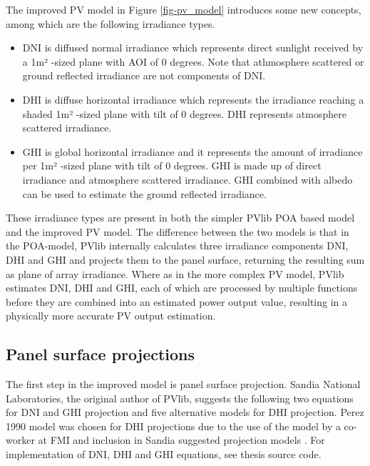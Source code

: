 \noindent 
The improved PV model in Figure \ref{fig-pv_model} introduces some new concepts, among which are the following irradiance types.

\begin{itemize}
\item DNI is diffused normal irradiance which represents direct sunlight received by a 1m² -sized plane with AOI of 0 degrees. Note that athmosphere scattered or ground reflected irradiance are not components of DNI.

\item DHI is diffuse horizontal irradiance which represents the irradiance reaching a shaded 1m² -sized plane with tilt of 0 degrees. DHI represents atmosphere scattered irradiance.

\item GHI is global horizontal irradiance and it represents the amount of irradiance per 1m² -sized plane with tilt of 0 degrees. GHI is made up of direct irradiance and atmosphere scattered irradiance. GHI combined with albedo can be used to estimate the ground reflected irradiance.
\end{itemize}

\noindent
These irradiance types are present in both the simpler PVlib POA based model and the improved PV model. The difference between the two models is that in the POA-model, PVlib internally calculates three irradiance components DNI, DHI and GHI and projects them to the panel surface, returning the resulting sum as plane of array irradiance. Where as in the more complex PV model, PVlib estimates DNI, DHI and GHI, each of which are processed by multiple functions before they are combined into an estimated power output value, resulting in a physically more accurate PV output estimation.

\subsection{Panel surface projections}

The first step in the improved model is panel surface projection. Sandia National Laboratories, the original author of PVlib, suggests the following two equations for DNI and GHI projection and five alternative models for DHI projection. Perez 1990 model \cite{perez} was chosen for DHI projections due to the use of the model by a co-worker at FMI and inclusion in Sandia suggested projection models \cite{sandia_poa_dhi}. For implementation of DNI, DHI and GHI equations, see thesis source code.

